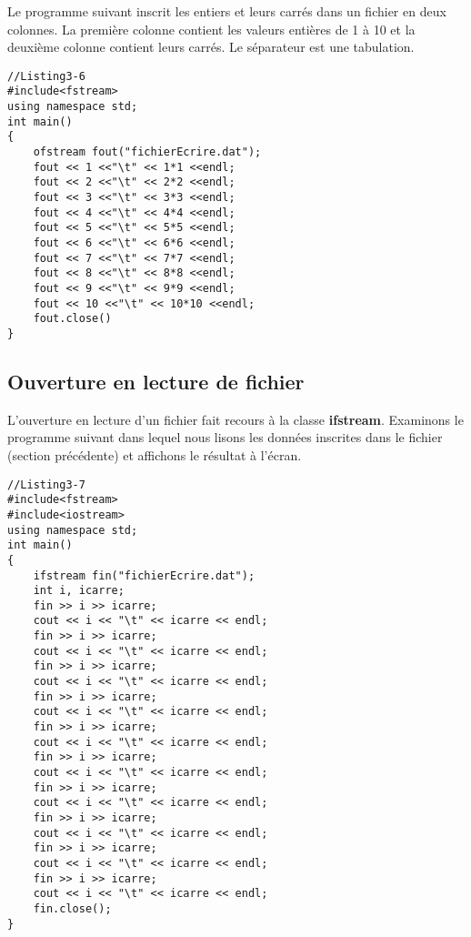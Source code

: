 \documentclass[a4paper, oneside,11pt]{book}
\begin{document}
Le programme suivant inscrit les entiers et leurs carr\'es dans un fichier en deux colonnes. La premi\`ere colonne contient les valeurs enti\`eres de 
1 \`a 10 et la deuxi\`eme colonne contient leurs carr\'es. Le s\'eparateur est une tabulation.


\begin{lstlisting}
//Listing3-6
#include<fstream>
using namespace std;
int main()
{
    ofstream fout("fichierEcrire.dat");
    fout << 1 <<"\t" << 1*1 <<endl;
    fout << 2 <<"\t" << 2*2 <<endl;
    fout << 3 <<"\t" << 3*3 <<endl;
    fout << 4 <<"\t" << 4*4 <<endl;
    fout << 5 <<"\t" << 5*5 <<endl;
    fout << 6 <<"\t" << 6*6 <<endl;
    fout << 7 <<"\t" << 7*7 <<endl;
    fout << 8 <<"\t" << 8*8 <<endl;
    fout << 9 <<"\t" << 9*9 <<endl;
    fout << 10 <<"\t" << 10*10 <<endl;
    fout.close()
}
\end{lstlisting}


\subsection{Ouverture en lecture de fichier}
L'ouverture en lecture d'un fichier fait recours \`a la classe \textbf{ifstream}. Examinons le programme suivant dans lequel nous lisons les donn\'ees inscrites dans le fichier 
(section pr\'ec\'edente) et affichons le r\'esultat \`a l'\'ecran.

\begin{lstlisting}
//Listing3-7
#include<fstream>
#include<iostream>
using namespace std;
int main()
{
    ifstream fin("fichierEcrire.dat");
    int i, icarre;
    fin >> i >> icarre;
    cout << i << "\t" << icarre << endl;
    fin >> i >> icarre;
    cout << i << "\t" << icarre << endl;
    fin >> i >> icarre;
    cout << i << "\t" << icarre << endl;
    fin >> i >> icarre;
    cout << i << "\t" << icarre << endl;
    fin >> i >> icarre;
    cout << i << "\t" << icarre << endl;
    fin >> i >> icarre;
    cout << i << "\t" << icarre << endl;
    fin >> i >> icarre;
    cout << i << "\t" << icarre << endl;
    fin >> i >> icarre;
    cout << i << "\t" << icarre << endl;
    fin >> i >> icarre;
    cout << i << "\t" << icarre << endl;
    fin >> i >> icarre;
    cout << i << "\t" << icarre << endl;
    fin.close();
}
\end{lstlisting}
\end{document}
